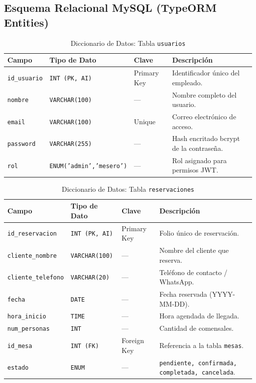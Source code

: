 \documentclass[12pt,a4paper]{article}
\begin{document}
\subsection{Esquema Relacional MySQL (TypeORM Entities)}

\begin{table}[H]\small\centering
\caption{Diccionario de Datos: Tabla \texttt{usuarios}}
\begin{tabular}{|l|l|l|p{5cm}|}
\hline
\textbf{Campo} & \textbf{Tipo de Dato} & \textbf{Clave} & \textbf{Descripción} \\ \hline
\texttt{id\_usuario} & \texttt{INT (PK, AI)} & Primary Key & Identificador único del empleado. \\ \hline
\texttt{nombre} & \texttt{VARCHAR(100)} & --- & Nombre completo del usuario. \\ \hline
\texttt{email} & \texttt{VARCHAR(100)} & Unique & Correo electrónico de acceso. \\ \hline
\texttt{password} & \texttt{VARCHAR(255)} & --- & Hash encritado bcrypt de la contraseña. \\ \hline
\texttt{rol} & \texttt{ENUM('admin','mesero')} & --- & Rol asignado para permisos JWT. \\ \hline
\end{tabular}
\end{table}

\begin{table}[H]\small\centering
\caption{Diccionario de Datos: Tabla \texttt{reservaciones}}
\begin{tabular}{|l|l|l|p{5cm}|}
\hline
\textbf{Campo} & \textbf{Tipo de Dato} & \textbf{Clave} & \textbf{Descripción} \\ \hline
\texttt{id\_reservacion} & \texttt{INT (PK, AI)} & Primary Key & Folio único de reservación. \\ \hline
\texttt{cliente\_nombre} & \texttt{VARCHAR(100)} & --- & Nombre del cliente que reserva. \\ \hline
\texttt{cliente\_telefono} & \texttt{VARCHAR(20)} & --- & Teléfono de contacto / WhatsApp. \\ \hline
\texttt{fecha} & \texttt{DATE} & --- & Fecha reservada (YYYY-MM-DD). \\ \hline
\texttt{hora\_inicio} & \texttt{TIME} & --- & Hora agendada de llegada. \\ \hline
\texttt{num\_personas} & \texttt{INT} & --- & Cantidad de comensales. \\ \hline
\texttt{id\_mesa} & \texttt{INT (FK)} & Foreign Key & Referencia a la tabla \texttt{mesas}. \\ \hline
\texttt{estado} & \texttt{ENUM} & --- & \texttt{pendiente, confirmada, completada, cancelada}. \\ \hline
\end{tabular}
\end{table}
\end{document}
